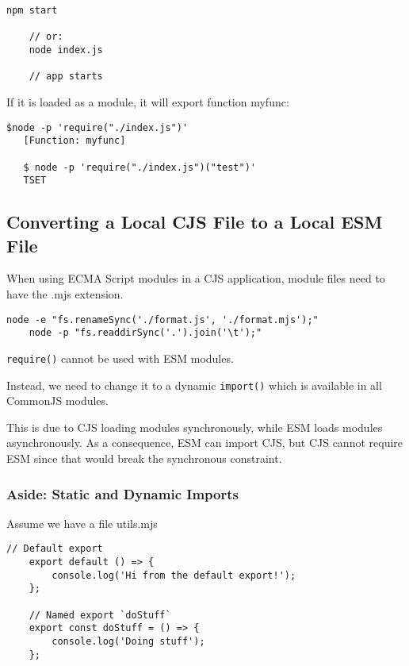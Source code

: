 \documentclass{scrartcl}
\begin{document}
\begin{lstlisting}[style=myBash]
    npm start

    // or:
    node index.js

    // app starts
\end{lstlisting}

If it is loaded as a module, it will export function myfunc:

\begin{lstlisting}[style=myBash]
   $node -p 'require("./index.js")'
   [Function: myfunc]

   $ node -p 'require("./index.js")("test")'
   TSET
\end{lstlisting}

\subsection{Converting a Local CJS File to a Local ESM File}

When using ECMA Script modules in a CJS application, module files need to have the .mjs extension.

\begin{lstlisting}[style=myBash]
    node -e "fs.renameSync('./format.js', './format.mjs');"
    node -p "fs.readdirSync('.').join('\t');"
\end{lstlisting}

\lstinline|require()| cannot be used with ESM modules.

Instead, we need to change it to a dynamic \lstinline|import()| which is available in all CommonJS modules.

This is due to CJS loading modules synchronously, while ESM loads modules asynchronously.
As a consequence, ESM can import CJS, but CJS cannot require ESM since that would break the synchronous constraint.

\subsubsection{Aside: Static and Dynamic Imports}

Assume we have a file utils.mjs

\begin{lstlisting}[style=ES6]
    // Default export
    export default () => {
        console.log('Hi from the default export!');
    };

    // Named export `doStuff`
    export const doStuff = () => {
        console.log('Doing stuff');
    };
\end{lstlisting}
\end{document}
